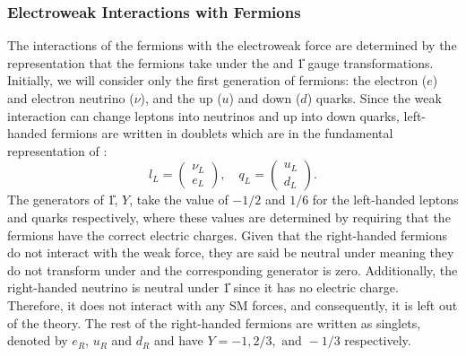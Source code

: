 \subsubsection{Electroweak Interactions with Fermions}
The interactions of the fermions with the electroweak force are determined by the representation that the fermions take under the  and \U{1} gauge transformations. Initially, we will consider only the first generation of fermions: the electron ($e$) and electron neutrino ($\nu$), and the up ($u$) and down ($d$) quarks. Since the weak interaction can change leptons into neutrinos and up into down quarks, left-handed fermions are written in doublets which are in the fundamental representation of :
\begin{equation}
  l_L = \begin{pmatrix}
    \nu_L \\ e_L 
  \end{pmatrix},\quad
  q_L = \begin{pmatrix}
    u_L \\ d_L
  \end{pmatrix}.
\end{equation}
The generators of \U{1}, $Y$, take the value of $-1/2$ and $1/6$ for the left-handed leptons and quarks respectively, where these values are determined by requiring that the fermions have the correct electric charges. Given that the right-handed fermions do not interact with the weak force, they are said be neutral under  meaning they do not transform under  and the corresponding generator is zero. Additionally, the right-handed neutrino is neutral under \U{1} since it has no electric charge. Therefore, it does not interact with any SM forces, and consequently, it is left out of the theory. The rest of the right-handed fermions are written as singlets, denoted by $e_R$, $u_R$ and $d_R$ and have $Y = -1, 2/3, \text{ and } -1/3$ respectively.


